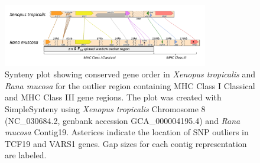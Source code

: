 \documentclass[9pt,twoside,lineno]{pnas-new}
\begin{document}
\begin{figure}

{\centering \includegraphics[width=0.8\textwidth]{figures/synteny_figure.png}

}

\caption{\label{fig-synteny-plot}Synteny plot showing conserved gene
order in \emph{Xenopus tropicalis} and \emph{Rana mucosa} for the
outlier region containing MHC Class I Classical and MHC Class III gene
regions. The plot was created with SimpleSynteny \citep{veltri2016}
using \emph{Xenopus tropicalis} Chromosome 8 (NC\_030684.2, genbank
accession GCA\_000004195.4) and \emph{Rana mucosa} Contig19. Asterices
indicate the location of SNP outliers in TCF19 and VARS1 genes. Gap
sizes for each contig representation are labeled.}

\end{figure}\clearpage

\newpage
\end{document}
